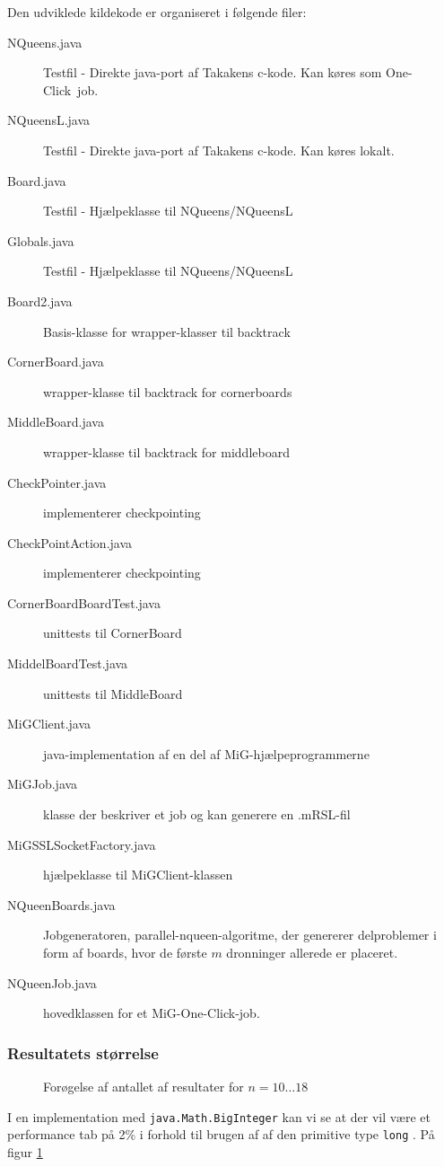 \documentclass[pdf,draft,a4paper,11pt]{article}
\newcommand{\mig}{MiG}
\newcommand{\oc}{One-Click}
\begin{document}
Den udviklede kildekode er organiseret i følgende filer:
\begin{description}
	\item[NQueens.java] Testfil - Direkte java-port af Takakens c-kode. Kan køres som \oc\ job.
	\item[NQueensL.java] Testfil - Direkte java-port af Takakens c-kode. Kan køres lokalt.
	\item[Board.java] Testfil - Hjælpeklasse til NQueens/NQueensL
	\item[Globals.java] Testfil - Hjælpeklasse til NQueens/NQueensL
	\item[Board2.java] Basis-klasse for wrapper-klasser til backtrack
	\item[CornerBoard.java] wrapper-klasse til backtrack for cornerboards
	\item[MiddleBoard.java] wrapper-klasse til backtrack for middleboard
	\item[CheckPointer.java] implementerer checkpointing
	\item[CheckPointAction.java] implementerer checkpointing
	\item[CornerBoardBoardTest.java] unittests til CornerBoard
	\item[MiddelBoardTest.java] unittests til MiddleBoard
	\item[MiGClient.java] java-implementation af en del af \mig-hjælpeprogrammerne
	\item[MiGJob.java] klasse der beskriver et job og kan generere en .mRSL-fil
	\item[MiGSSLSocketFactory.java] hjælpeklasse til MiGClient-klassen
	\item[NQueenBoards.java] Jobgeneratoren, parallel-nqueen-algoritme, der genererer delproblemer i form af boards, hvor de første $m$ dronninger allerede er placeret. 
	\item[NQueenJob.java] hovedklassen for et \mig-\oc-job. 
\end{description}



\subsubsection{Resultatets størrelse}

\begin{figure}
\caption{Forøgelse af antallet af resultater for $n=10\ldots18$}
\label{solrelativecount}
\end{figure}


I en implementation med \texttt{java.Math.BigInteger} kan vi se at der vil være et performance tab på 2\% i forhold til brugen af af den primitive type \texttt{long} . 
På figur \ref{solrelativecount}
\end{document}
